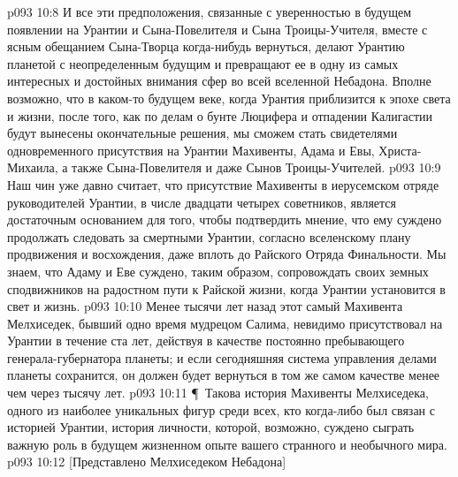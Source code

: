 \vs p093 10:8 И все эти предположения, связанные с уверенностью в будущем появлении на Урантии и Сына\hyp{}Повелителя и Сына Троицы\hyp{}Учителя, вместе с ясным обещанием Сына\hyp{}Творца когда\hyp{}нибудь вернуться, делают Урантию планетой с неопределенным будущим и превращают ее в одну из самых интересных и достойных внимания сфер во всей вселенной Небадона. Вполне возможно, что в каком\hyp{}то будущем веке, когда Урантия приблизится к эпохе света и жизни, после того, как по делам о бунте Люцифера и отпадении Калигастии будут вынесены окончательные решения, мы сможем стать свидетелями одновременного присутствия на Урантии Махивенты, Адама и Евы, Христа\hyp{}Михаила, а также Сына\hyp{}Повелителя и даже Сынов Троицы\hyp{}Учителей.
\vs p093 10:9 Наш чин уже давно считает, что присутствие Махивенты в иерусемском отряде руководителей Урантии, в числе двадцати четырех советников, является достаточным основанием для того, чтобы подтвердить мнение, что ему суждено продолжать следовать за смертными Урантии, согласно вселенскому плану продвижения и восхождения, даже вплоть до Райского Отряда Финальности. Мы знаем, что Адаму и Еве суждено, таким образом, сопровождать своих земных сподвижников на радостном пути к Райской жизни, когда Урантии установится в свет и жизнь.
\vs p093 10:10 Менее тысячи лет назад этот самый Махивента Мелхиседек, бывший одно время мудрецом Салима, невидимо присутствовал на Урантии в течение ста лет, действуя в качестве постоянно пребывающего генерала\hyp{}губернатора планеты; и если сегодняшняя система управления делами планеты сохранится, он должен будет вернуться в том же самом качестве менее чем через тысячу лет.
\vs p093 10:11 \P\ Такова история Махивенты Мелхиседека, одного из наиболее уникальных фигур среди всех, кто когда\hyp{}либо был связан с историей Урантии, история личности, которой, возможно, суждено сыграть важную роль в будущем жизненном опыте вашего странного и необычного мира.
\vs p093 10:12 [Представлено Мелхиседеком Небадона]
